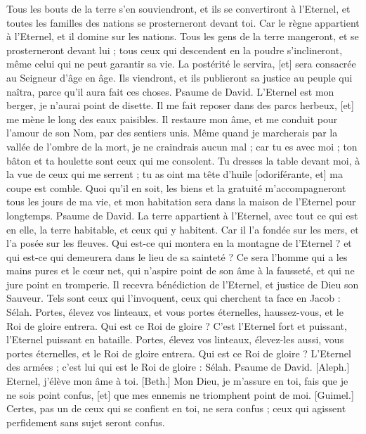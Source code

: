 \begin{multicols}{2}
Tous les bouts de la terre s'en souviendront, et ils se convertiront à l'Eternel, et toutes les familles des nations se prosterneront devant toi.
Car le règne appartient à l'Eternel, et il domine sur les nations.
Tous les gens de la terre mangeront, et se prosterneront devant lui ; tous ceux qui descendent en la poudre s'inclineront, même celui qui ne peut garantir sa vie.
La postérité le servira, [et] sera consacrée au Seigneur d'âge en âge.
Ils viendront, et ils publieront sa justice au peuple qui naîtra, parce qu'il aura fait ces choses.
\VerseOne{}Psaume de David. L'Eternel est mon berger, je n'aurai point de disette.
Il me fait reposer dans des parcs herbeux, [et] me mène le long des eaux paisibles.
Il restaure mon âme, et me conduit pour l'amour de son Nom, par des sentiers unis.
Même quand je marcherais par la vallée de l'ombre de la mort, je ne craindrais aucun mal ; car tu es avec moi ; ton bâton et ta houlette sont ceux qui me consolent.
Tu dresses la table devant moi, à la vue de ceux qui me serrent ; tu as oint ma tête d'huile [odoriférante, et] ma coupe est comble.
Quoi qu'il en soit, les biens et la gratuité m'accompagneront tous les jours de ma vie, et mon habitation sera dans la maison de l'Eternel pour longtemps.
\VerseOne{}Psaume de David. La terre appartient à l'Eternel, avec tout ce qui est en elle, la terre habitable, et ceux qui y habitent.
Car il l'a fondée sur les mers, et l'a posée sur les fleuves.
Qui est-ce qui montera en la montagne de l'Eternel ? et qui est-ce qui demeurera dans le lieu de sa sainteté ?
Ce sera l'homme qui a les mains pures et le cœur net, qui n'aspire point de son âme à la fausseté, et qui ne jure point en tromperie.
Il recevra bénédiction de l'Eternel, et justice de Dieu son Sauveur.
Tels sont ceux qui l'invoquent, ceux qui cherchent ta face en Jacob : Sélah.
Portes, élevez vos linteaux, et vous portes éternelles, haussez-vous, et le Roi de gloire entrera.
Qui est ce Roi de gloire ? C'est l'Eternel fort et puissant, l'Eternel puissant en bataille.
Portes, élevez vos linteaux, élevez-les aussi, vous portes éternelles, et le Roi de gloire entrera.
Qui est ce Roi de gloire ? L'Eternel des armées ; c'est lui qui est le Roi de gloire : Sélah.
\VerseOne{}Psaume de David. [Aleph.] Eternel, j'élève mon âme à toi.
[Beth.] Mon Dieu, je m'assure en toi, fais que je ne sois point confus, [et] que mes ennemis ne triomphent point de moi.
[Guimel.] Certes, pas un de ceux qui se confient en toi, ne sera confus ; ceux qui agissent perfidement sans sujet seront confus.

\end{multicols}
